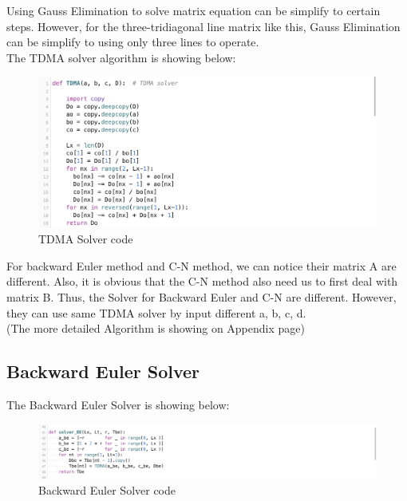 \documentclass[12pt]{article}
\begin{document}
Using Gauss Elimination to solve matrix equation can be simplify to certain steps. However, for the three-tridiagonal line matrix like this, Gauss Elimination can be simplify to using only three lines to operate.\\

The TDMA solver algorithm is showing below:



\begin{figure}[H] 
\centering 
\includegraphics[scale=0.25]{TDMA solver.jpg} 
\caption{TDMA Solver code} 
\label{TDMA Solver code} 
\end{figure}


For backward Euler method and C-N method, we can notice their matrix A are different. Also, it is obvious that the C-N method also need us to first deal with matrix B. Thus, the Solver for Backward Euler and C-N are different. However, they can use same TDMA solver by input different a, b, c, d.\\


(The more detailed Algorithm is showing on Appendix page)


\subsection{Backward Euler Solver}
The Backward Euler Solver is showing below:


\begin{figure}[H] 
\centering 
\includegraphics[scale=0.25]{Backward Euler Solver.jpg} 
\caption{Backward Euler Solver code} 
\label{TDMA Solver code} 
\end{figure}
\end{document}
